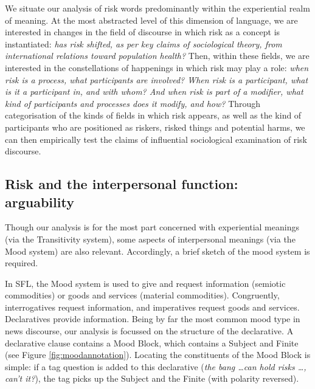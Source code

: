 We situate our analysis of risk words predominantly within the experiential realm of meaning. At the most abstracted level of this dimension of language, we are interested in changes in the field of discourse in which risk as a concept is instantiated: \emph{has risk shifted, as per key claims of sociological theory, from international relations toward population health?} Then, within these fields, we are interested in the constellations of happenings in which risk may play a role: \emph{when risk is a process, what participants are involved? When risk is a participant, what is it a participant in, and with whom? And when risk is part of a modifier, what kind of participants and processes does it modify, and how?} Through categorisation of the kinds of fields in which risk appears, as well as the kind of participants who are positioned as riskers, risked things and potential harms, we can then empirically test the claims of influential sociological examination of risk discourse. %



\subsection{Risk and the interpersonal function: arguability}

Though our analysis is for the most part concerned with experiential meanings (via the Transitivity system), some aspects of interpersonal meanings (via the Mood system) are also relevant. Accordingly, a brief sketch of the mood system is required.

In SFL, the Mood system is used to give and request information (semiotic commodities) or goods and services (material commodities). Congruently, interrogatives request information, and imperatives request goods and services. Declaratives provide information. Being by far the most common mood type in news discourse, our analysis is focussed on the structure of the declarative. A declarative clause contains a Mood Block, which contains a Subject and Finite (see Figure \ref{fig:moodannotation}). Locating the constituents of the Mood Block is simple: if a tag question is added to this declarative (\emph{the bang \dots can hold risks \dots, can't it?}), the tag picks up the Subject and the Finite (with polarity reversed).

